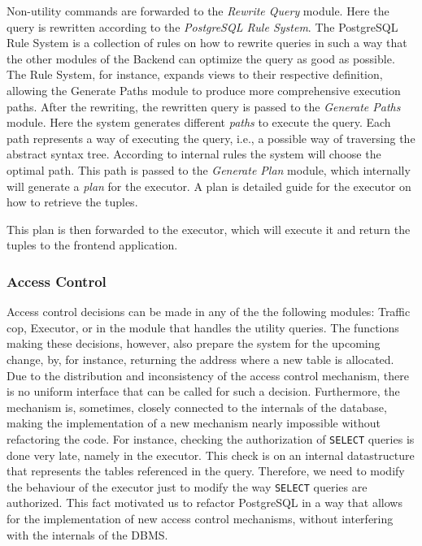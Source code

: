 Non-utility commands are forwarded to the \emph{Rewrite Query} module.
%
Here the query is rewritten according to the \emph{PostgreSQL Rule System}.
%
The PostgreSQL Rule System is a collection of rules on how to rewrite queries in such a way that the other modules of the Backend can optimize the query as good as possible.
The Rule System, for instance, expands views to their respective definition, allowing the Generate Paths module to produce more comprehensive execution paths.
%
After the rewriting, the rewritten query is passed to the \emph{Generate Paths} module.
%
Here the system generates different \emph{paths} to execute the query.
%
Each path represents a way of executing the query, i.e., a possible way of traversing the abstract syntax tree.
%
According to internal rules the system will choose the optimal path.
%
This path is passed to the \emph{Generate Plan} module, which internally will generate a \emph{plan} for the executor.
%
A plan is detailed guide for the executor on how to retrieve the tuples.

This plan is then forwarded to the executor, which will execute it and return the tuples to the frontend application.
%
\subsubsection{Access Control}
%
Access control decisions can be made in any of the the following modules: Traffic cop, Executor, or in the module that handles the utility queries.
%
The functions making these decisions, however, also prepare the system for the upcoming change, by, for instance, returning the address where a new table is allocated.
%
Due to the distribution and inconsistency of the access control mechanism, there is no uniform interface that can be called for such a decision.
%
Furthermore,  the mechanism is, sometimes, closely connected to the internals of the database, making the implementation of a new mechanism nearly impossible without refactoring the code.
%
For instance, checking the authorization of \texttt{SELECT} queries is done very late, namely in the executor.
%
This check is on an internal datastructure that represents the tables referenced in the query.
%
Therefore, we need to modify the behaviour of the executor just to modify the way \texttt{SELECT} queries are authorized.
%
This fact motivated us to refactor PostgreSQL in a way that allows for the implementation of new access control mechanisms, without interfering with the internals of the DBMS.

